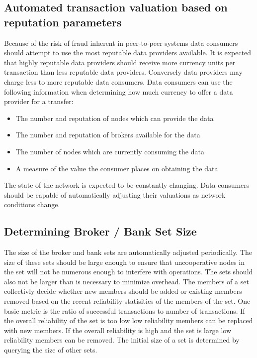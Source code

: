 \documentclass[%
				10pt,
        final,
        notitlepage,
        narroweqnarray,
        inline,
        twoside,
        ]{ieee}
\begin{document}
\subsection{Automated transaction valuation based on reputation parameters}
Because of the risk of fraud inherent in peer-to-peer systems data consumers should attempt to use the most reputable data providers available.  It is expected that highly reputable data providers should receive more currency units per transaction than less reputable data providers.  Conversely data providers may charge less to more reputable data consumers.  
Data consumers can use the following information when determining how much currency to offer a data provider for a transfer:
\begin{itemize}
\item The number and reputation of nodes which can provide the data
\item The number and reputation of brokers available for the data
\item The number of nodes which are currently consuming the data
\item A measure of the value the consumer places on obtaining the data
\end{itemize}
The state of the network is expected to be constantly changing.  Data consumers should be capable of automatically adjusting their valuations as network conditions change. 

\subsection{Determining Broker / Bank Set Size}
The size of the broker and bank sets are automatically adjusted periodically.  The size of these sets should be large enough to ensure that uncooperative nodes in the set will not be numerous enough to interfere with operations.  The sets should also not be larger than is necessary to minimize overhead.  The members of a set collectivly decide whether new members should be added or existing members removed based on the recent reliability statisitics of the members of the set.  One basic metric is the ratio of successful transactions to number of transactions.  If the overall reliability of the set is too low low reliability members can be replaced with new members.  If the overall reliability is high and the set is large low reliability members can be removed.  The initial size of a set is determined by querying the size of other sets.

\end{document}
